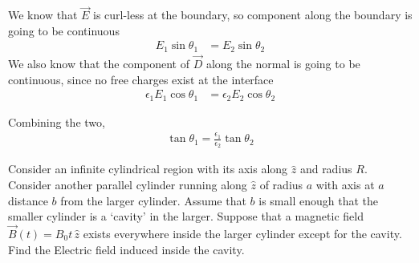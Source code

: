 \documentclass[../main.tex]{subfiles}
\begin{document}
\begin{questions}
\begin{center}
\end{center}

\begin{solution}
	We know that $\vec{E}$ is curl-less at the boundary, so component along the boundary is going to be continuous
	\begin{align}
		E_1\sin\theta_1 &= E_2\sin\theta_2
	\end{align}
	We also know that the component of $\vec{D}$ along the normal is going to be continuous, since no free charges exist at the interface
	\begin{align}
		\epsilon_1E_1\cos\theta_1 &= \epsilon_2E_2\cos\theta_2
	\end{align}

	Combining the two,
	\begin{align}
		\tan\theta_1 = \frac{\epsilon_1}{\epsilon_2}\tan\theta_2
	\end{align}
\end{solution}

\question Consider an infinite cylindrical region with its axis along $\hat{z}$ and radius $R$. Consider another parallel cylinder running along $\hat{z}$ of radius $a$ with axis at $a$ distance $b$ from the larger cylinder. Assume that $b$ is small enough that the smaller cylinder is a `cavity' in the larger. Suppose that a magnetic field $\vec{B}(t) = B_0t\,\hat{z}$ exists everywhere inside the larger cylinder except for the cavity. Find the Electric field induced inside the cavity.


\end{questions}
\end{document}
